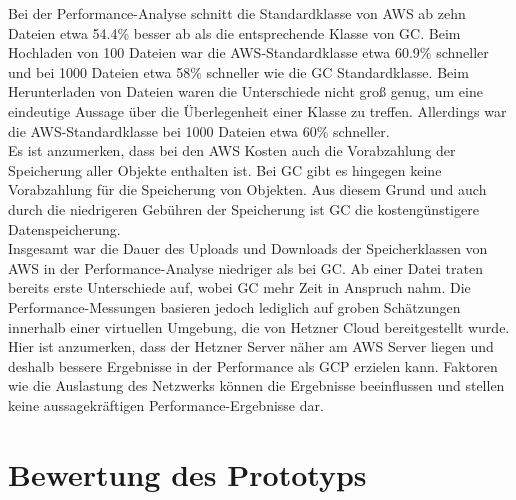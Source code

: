Bei der Performance-Analyse schnitt die Standardklasse von AWS ab zehn Dateien etwa 54.4\% besser ab als die entsprechende Klasse von GC. Beim Hochladen von 100 Dateien war die AWS-Standardklasse etwa 60.9\% schneller und bei 1000 Dateien etwa 58\% schneller wie die GC Standardklasse. Beim Herunterladen von Dateien waren die Unterschiede nicht groß genug, um eine eindeutige Aussage über die Überlegenheit einer Klasse zu treffen. Allerdings war die AWS-Standardklasse bei 1000 Dateien etwa 60\% schneller.\\

Es ist anzumerken, dass bei den AWS Kosten auch die Vorabzahlung der Speicherung aller Objekte enthalten ist. Bei GC gibt es hingegen keine Vorabzahlung für die Speicherung von Objekten. Aus diesem Grund und auch durch die niedrigeren Gebühren der Speicherung ist GC die kostengünstigere Datenspeicherung.\\

Insgesamt war die Dauer des Uploads und Downloads der Speicherklassen von AWS in der Performance-Analyse niedriger als bei GC. Ab einer Datei traten bereits erste Unterschiede auf, wobei GC mehr Zeit in Anspruch nahm. Die Performance-Messungen basieren jedoch lediglich auf groben Schätzungen innerhalb einer virtuellen Umgebung, die von Hetzner Cloud bereitgestellt wurde. Hier ist anzumerken, dass der Hetzner Server näher am AWS Server liegen und deshalb bessere Ergebnisse in der Performance als GCP erzielen kann. Faktoren wie die Auslastung des Netzwerks können die Ergebnisse beeinflussen und stellen keine aussagekräftigen Performance-Ergebnisse dar.\\

\section{Bewertung des Prototyps}

